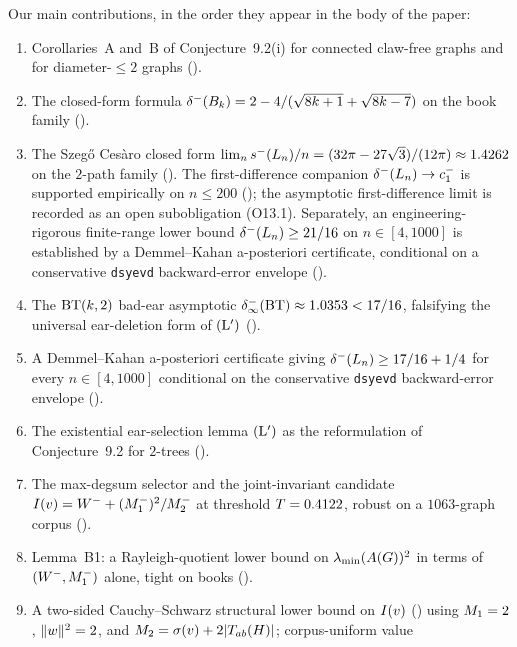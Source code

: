 Our main contributions, in the order they appear in the body of the paper:

\begin{enumerate}[label={\textbf{C\arabic*.}},leftmargin=*,itemsep=2pt]
\item Corollaries~A and~B of Conjecture~9.2(i) for connected claw-free
graphs and for diameter-$\le 2$ graphs ().
\item The closed-form formula
$\delta^{-}(B_{k}) = 2 - 4/(\sqrt{8k+1} + \sqrt{8k-7})$ on the book family
().
\item The Szeg\H{o} Ces\`aro closed form
$\lim_{n} s^{-}(L_{n})/n = (32\pi - 27\sqrt{3})/(12\pi) \approx 1.4262$
on the $2$-path family (). The
first-difference companion $\delta^{-}(L_{n}) \to c_{1}^{-}$ is supported
empirically on $n \le 200$ (); the
asymptotic first-difference limit is recorded as an open subobligation
(O13.1). Separately, an engineering-rigorous finite-range lower bound
$\delta^{-}(L_{n}) \ge 21/16$ on $n \in [4, 1000]$ is established by a
Demmel--Kahan a-posteriori certificate, conditional on a conservative
\texttt{dsyevd} backward-error envelope ().
\item The $\mathrm{BT}(k,2)$ bad-ear asymptotic
$\delta^{-}_{\infty}(\mathrm{BT}) \approx 1.0353 < 17/16$, falsifying the
universal ear-deletion form of $(\mathrm{L}')$ ().
\item A Demmel--Kahan a-posteriori certificate giving
$\delta^{-}(L_{n}) \ge 17/16 + 1/4$ for every $n \in [4, 1000]$ conditional on
the conservative \texttt{dsyevd} backward-error envelope
().
\item The existential ear-selection lemma $(\mathrm{L}')$ as the
reformulation of Conjecture~9.2 for $2$-trees
().
\item The max-degsum selector and the joint-invariant candidate
$I(v) = W^{-} + (M_{1}^{-})^{2}/M_{2}^{-}$ at threshold $T = 0.4122$,
robust on a $1063$-graph corpus ().
\item Lemma~B1: a Rayleigh-quotient lower bound on
$\lambda_{\min}(A(G))^{2}$ in terms of $(W^{-}, M_{1}^{-})$ alone,
tight on books ().
\item A two-sided Cauchy--Schwarz structural lower bound on $I(v)$
() using $M_{1} = 2$, $\|w\|^{2} = 2$, and
$M_{2} = \sigma(v) + 2|T_{ab}(H)|$; corpus-uniform value

\end{enumerate}
